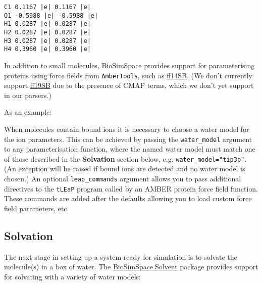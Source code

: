 \begin{verbatim}
C1 0.1167 |e| 0.1167 |e|
O1 -0.5988 |e| -0.5988 |e|
H1 0.0287 |e| 0.0287 |e|
H2 0.0287 |e| 0.0287 |e|
H3 0.0287 |e| 0.0287 |e|
H4 0.3960 |e| 0.3960 |e|
\end{verbatim}

In addition to small molecules, BioSimSpace provides support for
parameterising proteins using force fields from \texttt{AmberTools},
such as
\href{https://pubs.acs.org/doi/abs/10.1021/acs.jctc.5b00255}{ff14SB}.
(We don't currently support
\href{https://pubs.acs.org/doi/10.1021/acs.jctc.9b00591}{ff19SB} due to
the presence of CMAP terms, which we don't yet support in our parsers.)

As an example:

\begin{Shaded}
\begin{Highlighting}[]
\OperatorTok{=}\NormalTok{)[}\NormalTok{]}
\OperatorTok{=}
\end{Highlighting}
\end{Shaded}

When molecules contain bound ions it is necessary to choose a water
model for the ion parameters. This can be achieved by passing the
\texttt{water\_model} argument to any parameterisation function, where
the named water model must match one of those described in the
\textbf{Solvation} section below, e.g. \texttt{water\_model="tip3p"}.
(An exception will be raised if bound ions are detected and no water
model is chosen.) An optional \texttt{leap\_commands} argument allows
you to pass additional directives to the \texttt{tLEaP} program called
by an AMBER protein force field function. These commands are added after
the defaults allowing you to load custom force field parameters, etc.

\hypertarget{solvation}{%
\subsection{Solvation}\label{solvation}}

The next stage in setting up a system ready for simulation is to solvate
the molecule(s) in a box of water. The
\href{https://biosimspace.org/api/index_Solvent.html}{BioSimSpace.Solvent}
package provides support for solvating with a variety of water models:

\begin{Shaded}
\begin{Highlighting}[]
\end{Highlighting}
\end{Shaded}

